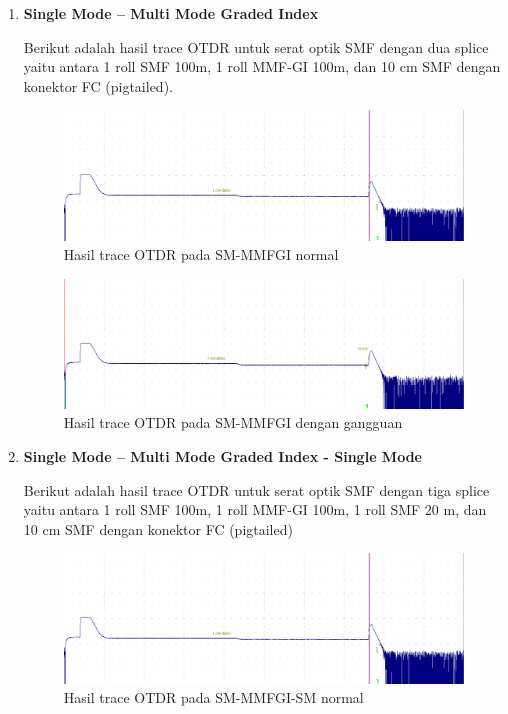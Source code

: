 \documentclass[12pt]{article}
\begin{document}
\begin{enumerate}
		\item \textbf{Single Mode – Multi Mode Graded Index}
		
		Berikut adalah hasil trace OTDR untuk serat optik SMF dengan dua splice yaitu antara 1 roll SMF 100m, 1 roll MMF-GI 100m, dan 10 cm SMF dengan konektor FC (pigtailed).
		
		\begin{figure}[h!]
			\centering
			\captionsetup{justification=centering}
			\includegraphics[width=0.5\linewidth]{images/Bab_4/Bab_4_3c1}
			\caption[Trace SM-MMFGI ]{\small{Hasil trace OTDR pada SM-MMFGI normal}}
		\end{figure}
		
		\begin{figure}[h!]
			\centering
			\captionsetup{justification=centering}
			\includegraphics[width=0.5\linewidth]{images/Bab_4/Bab_4_3c2}
			\caption[Trace SM-MMFGI ]{\small{Hasil trace OTDR pada SM-MMFGI dengan gangguan}}
		\end{figure}
		
		\item \textbf{Single Mode – Multi Mode Graded Index - Single Mode }
		
		Berikut adalah hasil trace OTDR untuk serat optik SMF dengan tiga splice yaitu antara 1 roll SMF 100m, 1 roll MMF-GI 100m, 1 roll SMF 20 m, dan 10 cm SMF dengan konektor FC (pigtailed)
		
		\begin{figure}[h!]
			\centering
			\captionsetup{justification=centering}
			\includegraphics[width=0.5\linewidth]{images/Bab_4/Bab_4_3c1}
			\caption[Trace SM-MMFGI-SM]{\small{Hasil trace OTDR pada SM-MMFGI-SM normal}}
		\end{figure}
		

\end{enumerate}
\end{document}
